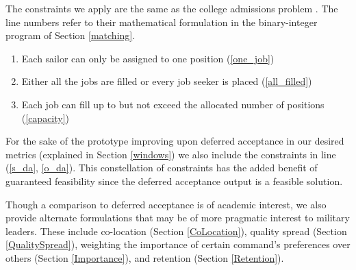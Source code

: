 The constraints we apply are the same as the college admissions problem \citep{1985_Roth}. The line numbers refer to their mathematical formulation in the binary-integer program of Section \ref{matching}.
\begin{enumerate}
\item Each sailor can only be assigned to one position (\ref{one_job})
\item Either all the jobs are filled or every job seeker is placed (\ref{all_filled})
\item Each job can fill up to but not exceed the allocated number of positions (\ref{capacity})
\end{enumerate}

For the sake of the prototype improving upon deferred acceptance in our desired metrics (explained in Section \ref{windows}) we also include the constraints in line (\ref{s_da}, \ref{o_da}). This constellation of constraints has the added benefit of guaranteed feasibility since the deferred acceptance output is a feasible solution.

Though a comparison to deferred acceptance is of academic interest, we also provide alternate formulations that may be of more pragmatic interest to military leaders. These include co-location (Section \ref{CoLocation}), quality spread (Section \ref{QualitySpread}), weighting the importance of certain command's preferences over others (Section \ref{Importance}), and retention (Section \ref{Retention}).
